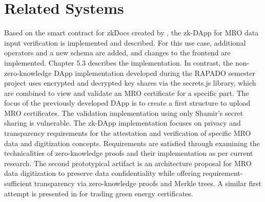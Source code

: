 \section{Related Systems}
Based on the smart contract for zkDocs created by \citet{zkdocs}, the zk-DApp for MRO data input verification is implemented and described. For this use case, additional operators and a new schema are added, and changes to the frontend are implemented. Chapter 5.3 describes the implementation. In contrast, the non-zero-knowledge DApp implementation developed during the RAPADO semester project uses encrypted and decrypted key shares via the secrets.js library, which are combined to view and validate an MRO certificate for a specific part. The focus of the previously developed DApp is to create a first structure to upload MRO certificates. The validation implementation using only Shamir's secret sharing is vulnerable. The zk-DApp implementation focuses on privacy and transparency requirements for the attestation and verification of specific MRO data and digitization concepts. Requirements are satisfied through examining the technicalities of zero-knowledge proofs and their implementation as per current research. The second prototypical artifact is an architecture proposal for MRO data digitization to preserve data confidentiality while offering requirement-sufficient transparency via zero-knowledge proofs and Merkle trees. A similar first attempt is presented in \citet{sedlemeirgrenenergy} for trading green energy certificates. 
